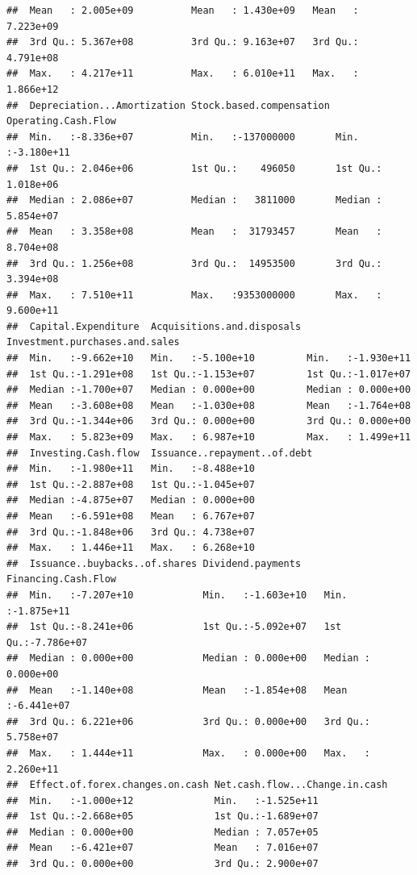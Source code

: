 \documentclass[11pt,]{article}
\begin{document}
\begin{verbatim}
##  Mean   : 2.005e+09          Mean   : 1.430e+09   Mean   : 7.223e+09  
##  3rd Qu.: 5.367e+08          3rd Qu.: 9.163e+07   3rd Qu.: 4.791e+08  
##  Max.   : 4.217e+11          Max.   : 6.010e+11   Max.   : 1.866e+12  
##  Depreciation...Amortization Stock.based.compensation Operating.Cash.Flow 
##  Min.   :-8.336e+07          Min.   :-137000000       Min.   :-3.180e+11  
##  1st Qu.: 2.046e+06          1st Qu.:    496050       1st Qu.: 1.018e+06  
##  Median : 2.086e+07          Median :   3811000       Median : 5.854e+07  
##  Mean   : 3.358e+08          Mean   :  31793457       Mean   : 8.704e+08  
##  3rd Qu.: 1.256e+08          3rd Qu.:  14953500       3rd Qu.: 3.394e+08  
##  Max.   : 7.510e+11          Max.   :9353000000       Max.   : 9.600e+11  
##  Capital.Expenditure  Acquisitions.and.disposals Investment.purchases.and.sales
##  Min.   :-9.662e+10   Min.   :-5.100e+10         Min.   :-1.930e+11            
##  1st Qu.:-1.291e+08   1st Qu.:-1.153e+07         1st Qu.:-1.017e+07            
##  Median :-1.700e+07   Median : 0.000e+00         Median : 0.000e+00            
##  Mean   :-3.608e+08   Mean   :-1.030e+08         Mean   :-1.764e+08            
##  3rd Qu.:-1.344e+06   3rd Qu.: 0.000e+00         3rd Qu.: 0.000e+00            
##  Max.   : 5.823e+09   Max.   : 6.987e+10         Max.   : 1.499e+11            
##  Investing.Cash.flow  Issuance..repayment..of.debt
##  Min.   :-1.980e+11   Min.   :-8.488e+10          
##  1st Qu.:-2.887e+08   1st Qu.:-1.045e+07          
##  Median :-4.875e+07   Median : 0.000e+00          
##  Mean   :-6.591e+08   Mean   : 6.767e+07          
##  3rd Qu.:-1.848e+06   3rd Qu.: 4.738e+07          
##  Max.   : 1.446e+11   Max.   : 6.268e+10          
##  Issuance..buybacks..of.shares Dividend.payments    Financing.Cash.Flow 
##  Min.   :-7.207e+10            Min.   :-1.603e+10   Min.   :-1.875e+11  
##  1st Qu.:-8.241e+06            1st Qu.:-5.092e+07   1st Qu.:-7.786e+07  
##  Median : 0.000e+00            Median : 0.000e+00   Median : 0.000e+00  
##  Mean   :-1.140e+08            Mean   :-1.854e+08   Mean   :-6.441e+07  
##  3rd Qu.: 6.221e+06            3rd Qu.: 0.000e+00   3rd Qu.: 5.758e+07  
##  Max.   : 1.444e+11            Max.   : 0.000e+00   Max.   : 2.260e+11  
##  Effect.of.forex.changes.on.cash Net.cash.flow...Change.in.cash
##  Min.   :-1.000e+12              Min.   :-1.525e+11            
##  1st Qu.:-2.668e+05              1st Qu.:-1.689e+07            
##  Median : 0.000e+00              Median : 7.057e+05            
##  Mean   :-6.421e+07              Mean   : 7.016e+07            
##  3rd Qu.: 0.000e+00              3rd Qu.: 2.900e+07            

\end{verbatim}
\end{document}

